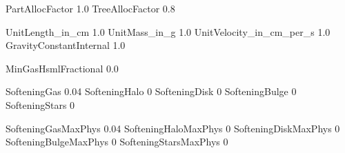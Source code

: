 PartAllocFactor       1.0
TreeAllocFactor       0.8



UnitLength_in_cm         1.0
UnitMass_in_g            1.0
UnitVelocity_in_cm_per_s 1.0
GravityConstantInternal  1.0    %


MinGasHsmlFractional     0.0  %

SofteningGas       0.04       %
SofteningHalo      0
SofteningDisk      0
SofteningBulge     0
SofteningStars     0

SofteningGasMaxPhys       0.04
SofteningHaloMaxPhys      0
SofteningDiskMaxPhys      0
SofteningBulgeMaxPhys     0
SofteningStarsMaxPhys     0













